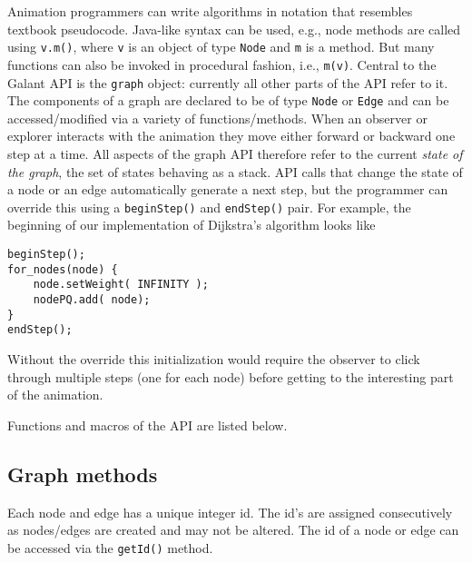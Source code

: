 
Animation programmers can write algorithms in notation that resembles
textbook pseudocode.
Java-like syntax can be used, e.g., node methods are called using
\texttt{v.m()}, where \texttt{v} is an object of type \texttt{Node} and \texttt{m} is a method.
But many functions can also be invoked in procedural fashion,
i.e., \texttt{m(v)}.
Central to the Galant API is the \texttt{graph} object: currently all other
parts of the API refer to it.
The components of a graph are declared to be of type \texttt{Node} or
\texttt{Edge} and can be accessed/modified via a variety of
functions/methods.
When an observer or explorer interacts with the animation they move either
forward or backward one step at a time.
All aspects of the graph API therefore refer to the current \emph{state of
  the graph}, the set of states behaving as a stack.
API calls that change the state of a node or an edge automatically
generate a next step,
but the programmer can override this using a \texttt{beginStep()} and
\texttt{endStep()} pair. For example, the beginning of our implementation of
Dijkstra's algorithm looks like
\begin{verbatim}
beginStep();
for_nodes(node) {
    node.setWeight( INFINITY );
    nodePQ.add( node);
}
endStep();
\end{verbatim}
Without the override this initialization would require the observer to click
through multiple steps (one for each node) before getting to the interesting
part of the animation.

Functions and macros of the API are listed below.

\subsection{Graph methods}

Each node and edge has a unique integer id.
The id's are assigned consecutively as nodes/edges are created
and may not be altered.
The id of a node or edge can be accessed via the \texttt{getId()} method.

